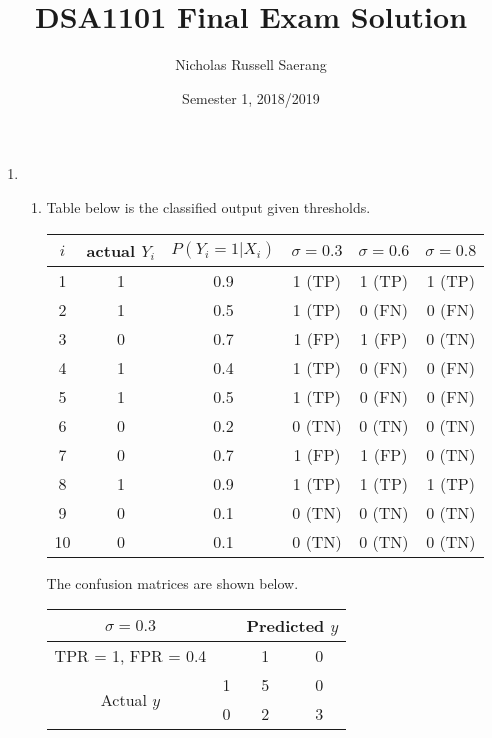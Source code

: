 \documentclass{article}
\title{DSA1101 Final Exam Solution}
\author{Nicholas Russell Saerang}
\date{Semester 1, 2018/2019}
\begin{document}
\maketitle

\begin{enumerate}
    \item 
    \begin{enumerate}
        \item Table below is the classified output given thresholds.
        \begin{center}
        \begin{tabular}{ |c|c|c|c|c|c| } 
        \hline
        $i$ & actual $Y_i$ & $P(Y_i=1\vert X_i)$ & $\sigma = 0.3$ & $\sigma = 0.6$ & $\sigma = 0.8$ \\
        \hline
        1 & 1 & 0.9 & 1 (TP) & 1 (TP) & 1 (TP) \\ 
        2 & 1 & 0.5 & 1 (TP) & 0 (FN) & 0 (FN) \\ 
        3 & 0 & 0.7 & 1 (FP) & 1 (FP) & 0 (TN) \\ 
        4 & 1 & 0.4 & 1 (TP) & 0 (FN) & 0 (FN) \\ 
        5 & 1 & 0.5 & 1 (TP) & 0 (FN) & 0 (FN) \\ 
        6 & 0 & 0.2 & 0 (TN) & 0 (TN) & 0 (TN) \\ 
        7 & 0 & 0.7 & 1 (FP) & 1 (FP) & 0 (TN) \\ 
        8 & 1 & 0.9 & 1 (TP) & 1 (TP) & 1 (TP) \\ 
        9 & 0 & 0.1 & 0 (TN) & 0 (TN) & 0 (TN) \\ 
        10 & 0 & 0.1 & 0 (TN) & 0 (TN) & 0 (TN) \\ 
        \hline
        \end{tabular}
        \end{center}
        The confusion matrices are shown below.
        \begin{center}
        \begin{tabular}{ |c|c|c|c| } 
        \hline
        $\sigma = 0.3$ & & \multicolumn{2}{|c|}{Predicted $y$}\\
        \hline
        TPR = 1, FPR = 0.4& & 1 & 0\\
        \hline
        \multirow{2}{4em}{Actual $y$} & 1 & 5 & 0\\
        & 0 & 2 & 3\\
        \hline
        \end{tabular}
        \end{center}
        \begin{center}

\end{center}
\end{enumerate}
\end{enumerate}
\end{document}
